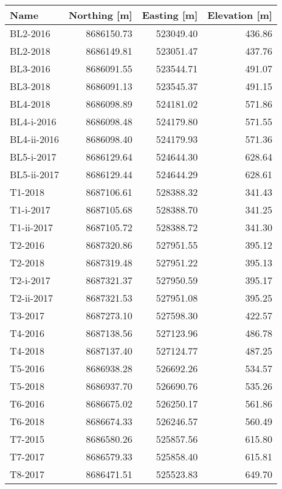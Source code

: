\begin{tabular}{lrrr}
\toprule
        Name &  Northing [m] &  Easting [m] &  Elevation [m] \\
\midrule
    BL2-2016 &    8686150.73 &    523049.40 &         436.86 \\
    BL2-2018 &    8686149.81 &    523051.47 &         437.76 \\
    BL3-2016 &    8686091.55 &    523544.71 &         491.07 \\
    BL3-2018 &    8686091.13 &    523545.37 &         491.15 \\
    BL4-2018 &    8686098.89 &    524181.02 &         571.86 \\
  BL4-i-2016 &    8686098.48 &    524179.80 &         571.55 \\
 BL4-ii-2016 &    8686098.40 &    524179.93 &         571.36 \\
  BL5-i-2017 &    8686129.64 &    524644.30 &         628.64 \\
 BL5-ii-2017 &    8686129.44 &    524644.29 &         628.61 \\
     T1-2018 &    8687106.61 &    528388.32 &         341.43 \\
   T1-i-2017 &    8687105.68 &    528388.70 &         341.25 \\
  T1-ii-2017 &    8687105.72 &    528388.72 &         341.30 \\
     T2-2016 &    8687320.86 &    527951.55 &         395.12 \\
     T2-2018 &    8687319.48 &    527951.22 &         395.13 \\
   T2-i-2017 &    8687321.37 &    527950.59 &         395.17 \\
  T2-ii-2017 &    8687321.53 &    527951.08 &         395.25 \\
     T3-2017 &    8687273.10 &    527598.30 &         422.57 \\
     T4-2016 &    8687138.56 &    527123.96 &         486.78 \\
     T4-2018 &    8687137.40 &    527124.77 &         487.25 \\
     T5-2016 &    8686938.28 &    526692.26 &         534.57 \\
     T5-2018 &    8686937.70 &    526690.76 &         535.26 \\
     T6-2016 &    8686675.02 &    526250.17 &         561.86 \\
     T6-2018 &    8686674.33 &    526246.57 &         560.49 \\
     T7-2015 &    8686580.26 &    525857.56 &         615.80 \\
     T7-2017 &    8686579.33 &    525858.40 &         615.81 \\
     T8-2017 &    8686471.51 &    525523.83 &         649.70 \\
\bottomrule
\end{tabular}
